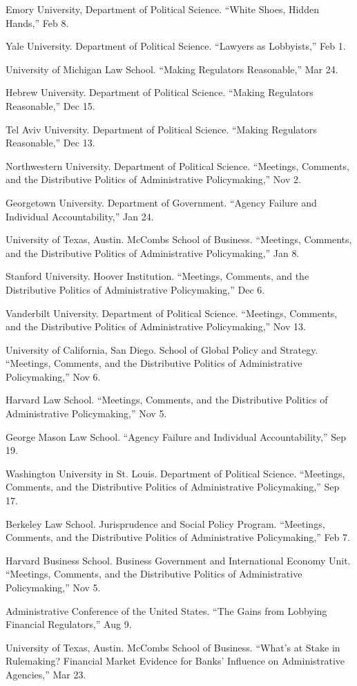 \documentclass[12pt,letterpaper]{report}
\newcommand{\talk}[4]{\item[#1]{\tab{}#3. \enquote{#2,} #4.}} %
\begin{document}
    \begin{tablist}
    \talk{2024}{White Shoes, Hidden Hands}{Emory University, Department of Political Science}{Feb 8}
    \talk{2023}{Lawyers as Lobbyists}{Yale University. Department of Political Science}{Feb 1}
	\talk{2022}{Making Regulators Reasonable}{University of Michigan Law School}{Mar 24}
	
    \talk{2021}{Making Regulators Reasonable}{Hebrew University. Department of Political Science}{Dec 15}
    	
	\talk{2021}{Making Regulators Reasonable}{Tel Aviv University. Department of Political Science}{Dec 13}
			
	\talk{2021}{Meetings, Comments, and the Distributive Politics of Administrative Policymaking}{Northwestern University. Department of Political Science}{Nov 2}
		
    \talk{2020}{Agency Failure and Individual Accountability}{Georgetown University. Department of Government}{Jan 24}
    \talk{2020}{Meetings, Comments, and the Distributive Politics of Administrative Policymaking}{University of Texas, Austin. McCombs School of Business}{Jan 8}
    \talk{2019}{Meetings, Comments, and the Distributive Politics of Administrative Policymaking}{Stanford University. Hoover Institution}{Dec 6}
    \talk{2019}{Meetings, Comments, and the Distributive Politics of Administrative Policymaking}{Vanderbilt University. Department of Political Science}{Nov 13}
    \talk{2019}{Meetings, Comments, and the Distributive Politics of Administrative Policymaking}{University of California, San Diego. School of Global Policy and Strategy}{Nov 6}
    \talk{2019}{Meetings, Comments, and the Distributive Politics of Administrative Policymaking}{Harvard Law School}{Nov 5}    
    \talk{2019}{Agency Failure and Individual Accountability}{George Mason Law School}{Sep 19}
    \talk{2019}{Meetings, Comments, and the Distributive Politics of Administrative Policymaking}{Washington University in St. Louis. Department of Political Science}{Sep 17}    
    \talk{2019}{Meetings, Comments, and the Distributive Politics of Administrative Policymaking}{Berkeley Law School. Jurisprudence and Social Policy Program}{Feb 7}    
    \talk{2019}{Meetings, Comments, and the Distributive Politics of Administrative Policymaking}{Harvard Business School. Business Government and International Economy Unit}{Nov 5}   
    \talk{2019}{The Gains from Lobbying Financial Regulators}{Administrative Conference of the United States}{Aug 9}    
    \talk{2018}{What’s at Stake in Rulemaking? Financial Market Evidence for Banks’ Influence on Administrative Agencies}{University of Texas, Austin. McCombs School of Business}{Mar 23}
    
    \end{tablist}
\end{document}
